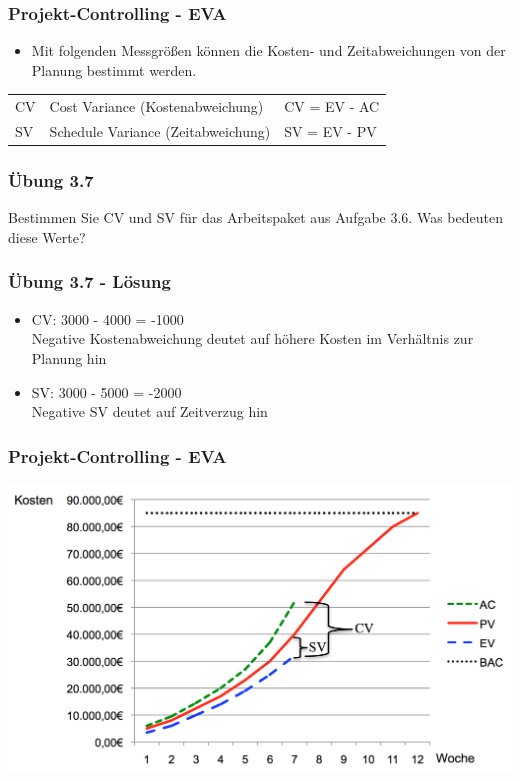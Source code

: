 \begin{frame}
\frametitle{Projekt-Controlling - EVA}
	\begin{itemize}
		\item Mit folgenden Messgrößen können die Kosten- und Zeitabweichungen
					von der Planung bestimmt werden.
	\end{itemize}
	\scriptsize
	\begin{table}[]
		\begin{tabular}{lll}
		 CV & Cost Variance (Kostenabweichung) & CV = EV - AC \\
		 SV & Schedule Variance (Zeitabweichung) & SV = EV - PV \\
		\end{tabular}
	\end{table}
	\normalsize
\end{frame}

\begin{frame}
\frametitle{Übung 3.7}
	Bestimmen Sie CV und SV für das Arbeitspaket aus Aufgabe 3.6.
	Was bedeuten diese Werte?
\end{frame}

\ifloesung
\begin{frame}
\frametitle{Übung 3.7 - Lösung}
	\begin{itemize}
		\item CV: 3000 - 4000 = -1000 \\
					Negative Kostenabweichung deutet auf höhere Kosten im Verhältnis zur Planung hin
		\item SV: 3000 - 5000 = -2000 \\
					Negative SV deutet auf Zeitverzug hin
	\end{itemize}
\end{frame}
\fi

\begin{frame}
\frametitle{Projekt-Controlling - EVA}
	\center\includegraphics[width=1\textwidth,
		keepaspectratio=true]{bilder/ev_analyse.png}
\end{frame}

